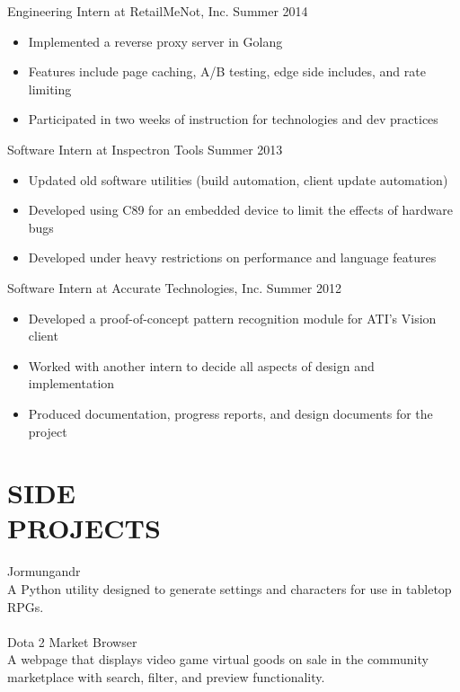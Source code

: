 \documentclass[line,margin]{res}
\begin{document}
\begin{resume}
                {\sc Engineering Intern at RetailMeNot, Inc.} \hfill Summer 2014
                 \begin{itemize}  \itemsep -2pt %
                 \item Implemented a reverse proxy server in Golang
                 \item Features include page caching, A/B testing, edge side includes, and rate limiting
                 \item Participated in two weeks of instruction for technologies and dev practices
                 \end{itemize}

                {\sc Software Intern at Inspectron Tools} \hfill Summer 2013
                 \begin{itemize}  \itemsep -2pt %
                 \item Updated old software utilities (build automation, client update automation)
                 \item Developed using C89 for an embedded device to limit the effects of hardware bugs
                 \item Developed under heavy restrictions on performance and language features
                 \end{itemize}
 
                {\sc Software Intern at Accurate Technologies, Inc.} \hfill            Summer 2012
                 \begin{itemize}  \itemsep -2pt %
                 \item Developed a proof-of-concept pattern recognition module for ATI’s Vision client
                 \item Worked with another intern to decide all aspects of design and implementation
                 \item Produced documentation, progress reports, and design documents for the project
                 \end{itemize} 

\section{\textcolor{HeaderColor}{SIDE \\ PROJECTS}}
	{\sc Jormungandr} \\
	A Python utility designed to generate settings and characters for use in tabletop RPGs.\\
\\
	{\sc Dota 2 Market Browser} \\
	A webpage that displays video game virtual goods on sale in the community marketplace with search, filter, and preview functionality.\\
	


\end{resume}
\end{document}
